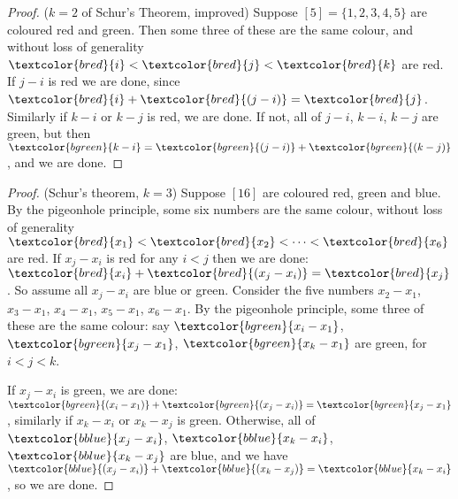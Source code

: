 \documentclass{article}
\newcommand{\red}[1]{\textcolor{bred}{#1}}
\newcommand{\green}[1]{\textcolor{bgreen}{#1}}
\newcommand{\blue}[1]{\textcolor{bblue}{#1}}
\begin{document}
\begin{proof}($k=2$ of Schur's Theorem, improved)
    Suppose $[5] = \{1, 2, 3, 4, 5\}$ are coloured \red{red} and \green{green}.
    Then some three of these are the same colour, and without loss of generality $\red{i} < \red{j} < \red{k}$ are \red{red}.
    If $j-i$ is \red{red} we are done, since $\red{i} + \red{(j-i)} = \red{j}$.
    Similarly if $k-i$ or $k-j$ is \red{red}, we are done.
    If not, all of $j-i$, $k-i$, $k-j$ are \green{green}, but then $\green{k-i} = \green{(j-i)} + \green{(k-j)}$, and we are done.
\end{proof}


\begin{proof}(Schur's theorem, $k=3$)
    Suppose $[16]$ are coloured \red{red}, \green{green} and \blue{blue}.
    By the pigeonhole principle, some six numbers are the same colour, without loss of generality $\red{x_1} < \red{x_2} < \dots < \red{x_6}$ are \red{red}.
    If $x_j - x_i$ is \red{red} for any $i<j$ then we are done: $\red{x_i} + \red{(x_j - x_i)} = \red{x_j}$.
    So assume all $x_j - x_i$ are \blue{blue} or \green{green}.
    Consider the five numbers $x_2 - x_1$, $x_3 - x_1$, $x_4 - x_1$, $x_5 - x_1$, $x_6 - x_1$.
    By the pigeonhole principle, some three of these are the same colour: say $\green{x_i - x_1}$, $\green{x_j - x_1}$, $\green{x_k - x_1}$ are green, for $i < j < k$.

    If $x_j - x_i$ is \green{green}, we are done: $\green{(x_i - x_1)} + \green{(x_j - x_i)} = \green{x_j - x_1}$, similarly if $x_k - x_i$ or $x_k - x_j$ is \green{green}.
    Otherwise, all of $\blue{x_j - x_i}$, $\blue{x_k - x_i}$, $\blue{x_k - x_j}$ are \blue{blue}, and we have $\blue{(x_j - x_i)} + \blue{(x_k - x_j)} = \blue{x_k - x_i}$, so we are done.
\end{proof}
\end{document}
